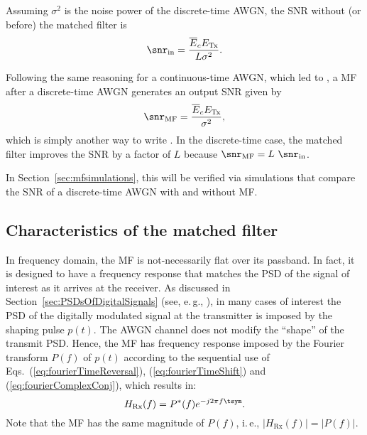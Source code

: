 Assuming $\sigma^2$ is the noise power of the discrete-time AWGN, the SNR without (or before) the matched filter is
\[
\snr_\textrm{in} = \frac{\overline{E}_c E_{\textrm{Tx}}}{L \sigma^2}.
\]

Following the same reasoning for a continuous-time AWGN, which led to , a MF after a discrete-time AWGN generates an output SNR given by
\[
\snr_\textrm{MF} = \frac{\overline E_c E_{\textrm{Tx}}}{\sigma^2},
\]
which is simply another way to write .
In the discrete-time case, the matched filter improves the SNR by a factor of $L$ because $\snr_\textrm{MF} = L \textrm{~} \snr_\textrm{in}$. 

In Section~\ref{sec:mfsimulations}, this will be verified via simulations that compare the SNR of a discrete-time AWGN with and without MF.


\subsection{Characteristics of the matched filter}

In frequency domain, the MF is not-necessarily flat over its passband. In fact, it is designed to have a frequency response that matches the PSD of the signal of interest as it arrives at the receiver. As discussed in Section~\ref{sec:PSDsOfDigitalSignals} (see, e.\,g., ), in many cases of interest the PSD of the digitally modulated signal
at the transmitter is imposed by the shaping pulse $p(t)$. The AWGN channel does
not modify the ``shape'' of the transmit PSD. 
Hence, the MF has frequency response imposed by the Fourier transform $P(f)$ of $p(t)$ according to
the sequential use of Eqs.~(\ref{eq:fourierTimeReversal}), (\ref{eq:fourierTimeShift}) and (\ref{eq:fourierComplexConj}), which results in:
\begin{equation}
H_\textrm{Rx}(f)=P^*(f)e^{-j2\pi f \tsym}. 
\end{equation}
Note that the MF has the same magnitude of $P(f)$, i.\,e., $|H_\textrm{Rx}(f)|=|P(f)|$. 



